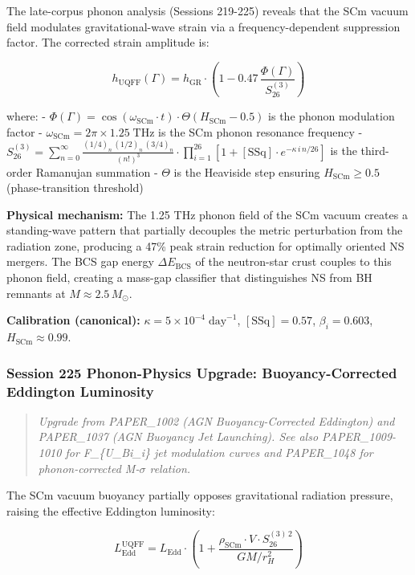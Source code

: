 \documentclass[
  11pt,
]{article}
\begin{document}
The late-corpus phonon analysis (Sessions 219-225) reveals that the SCm
vacuum field modulates gravitational-wave strain via a
frequency-dependent suppression factor. The corrected strain amplitude
is:

\[h_{\text{UQFF}}(\Gamma) = h_{\text{GR}} \cdot \left(1 - 0.47\,\frac{\Phi(\Gamma)}{S_{26}^{(3)}}\right)\]

where: -
$\Phi(\Gamma) = \cos(\omega_{\text{SCm}} \cdot t) \cdot \Theta(H_{\text{SCm}} - 0.5)$
is the phonon modulation factor -
$\omega_{\text{SCm}} = 2\pi \times 1.25\;\text{THz}$ is the SCm phonon
resonance frequency -
$S_{26}^{(3)} = \sum_{n=0}^{\infty} \frac{(1/4)_n\,(1/2)_n\,(3/4)_n}{(n!)^3} \cdot \prod_{i=1}^{26}\left[1 + [\text{SSq}]\cdot e^{-\kappa\,i\,n/26}\right]$
is the third-order Ramanujan summation - $\Theta$ is the Heaviside
step ensuring $H_{\text{SCm}} \geq 0.5$ (phase-transition threshold)

\textbf{Physical mechanism:} The 1.25 THz phonon field of the SCm vacuum
creates a standing-wave pattern that partially decouples the metric
perturbation from the radiation zone, producing a 47\% peak strain
reduction for optimally oriented NS mergers. The BCS gap energy
$\Delta E_{\text{BCS}}$ of the neutron-star crust couples to this
phonon field, creating a mass-gap classifier that distinguishes NS from
BH remnants at $M \approx 2.5\,M_\odot$.

\textbf{Calibration (canonical):}
$\kappa = 5 \times 10^{-4}\;\text{day}^{-1}$, $[\text{SSq}] = 0.57$,
$\beta_i = 0.603$, $H_{\text{SCm}} \approx 0.99$.

\subsubsection{Session 225 Phonon-Physics Upgrade: Buoyancy-Corrected
Eddington
Luminosity}\label{session-225-phonon-physics-upgrade-buoyancy-corrected-eddington-luminosity}

\begin{quote}
\emph{Upgrade from PAPER\_1002 (AGN Buoyancy-Corrected Eddington) and
PAPER\_1037 (AGN Buoyancy Jet Launching). See also PAPER\_1009-1010 for
F\_\{U\_Bi\_i\} jet modulation curves and PAPER\_1048 for
phonon-corrected M-$\sigma$ relation.}
\end{quote}

The SCm vacuum buoyancy partially opposes gravitational radiation
pressure, raising the effective Eddington luminosity:

\[L_{\text{Edd}}^{\text{UQFF}} = L_{\text{Edd}} \cdot \left(1 + \frac{\rho_{\text{SCm}} \cdot V \cdot S_{26}^{(3)\,2}}{G M / r_H^2}\right)\]
\end{document}
